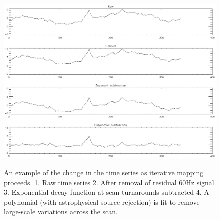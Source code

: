 \begin{figure}
  \begin{minipage}{6.5in}
    \begin{center}
      \includegraphics[scale=0.9]{iterative_mapping1}
      \caption{An example of the change in the time series as
      iterative mapping proceeds.  1. Raw time series 2. After removal
      of residual 60Hz signal 3. Exponential decay function at scan
      turnarounds subtracted 4. A polynomial (with astrophysical source
      rejection) is fit to remove large-scale variations across the scan. }
    \end{center}
    \label{fig:IterativeMapping}
  \end{minipage}
\end{figure}

\addtocounter{figure}{0}
\addtocounter{subfig}{1}

